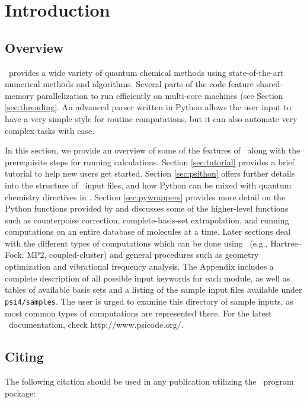 \section{Introduction} \label{sec:introduction}

\subsection{Overview} 

\PSIfour\ provides a wide variety of quantum chemical methods using
state-of-the-art numerical methods and algorithms.  Several parts of
the code feature shared-memory parallelization to run efficiently on
multi-core machines (see Section \ref{sec:threading}.  
An advanced parser written in Python allows the user
input to have a very simple style for routine computations, but it can also
automate very complex tasks with ease. 

In this section, we provide an overview of some of the features of
\PSIfour\ along with the prerequisite steps for running calculations.
Section \ref{sec:tutorial} provides a brief tutorial to help new users
get started.  Section \ref{sec:psithon} offers further details into the
structure of \PSIfour\ input files, and how Python can be mixed with
quantum chemistry directives in \PSIfour.  Section \ref{sec:pywrappers}
provides more detail on the Python functions provided by \PSIfour
and discusses some of the higher-level functions such as counterpoise
correction, complete-basis-set extrapolation, and running computations
on an entire database of molecules at a time.  Later sections deal with
the different types of computations which can be done using \PSIfour\
(e.g., Hartree--Fock, MP2, coupled-cluster) and general procedures
such as geometry optimization and vibrational frequency analysis.
The Appendix includes a complete description of all possible input
keywords for each module, as well as tables of available basis sets and
a listing of the sample input files available under {\tt psi4/samples}.
The user is urged to examine this directory of sample inputs, as
most common types of computations are represented there.
For the latest \PSIfour\ documentation, check \htmladdnormallink{{\tt
www.psicode.org}} {http://www.psicode.org/}.

\subsection{Citing \PSIfour}

The following citation should be used in any publication utilizing the
\PSIfour\ program package:


